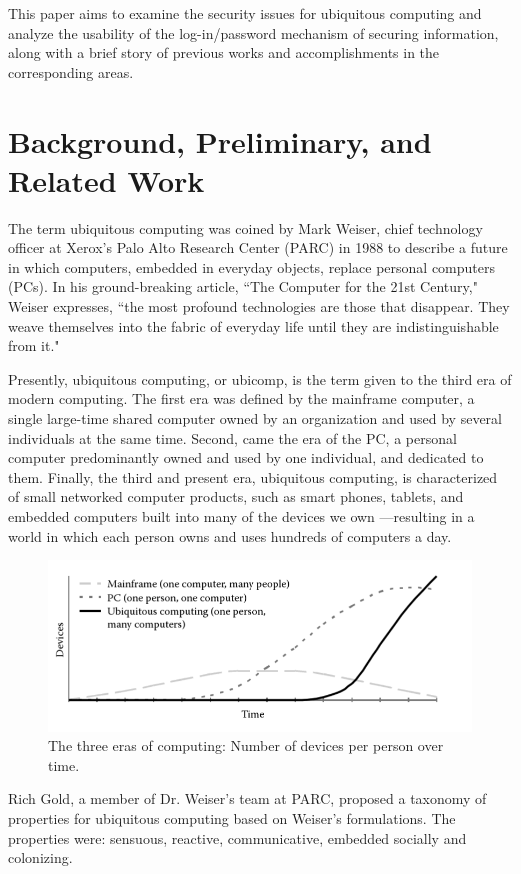 \documentclass{article}
\begin{document}
This paper aims to examine the security issues for ubiquitous computing and analyze the usability of the log-in/password mechanism of securing information, along with a brief story of previous works and accomplishments in the corresponding areas. 

\section{Background, Preliminary, and Related Work}
The term ubiquitous computing was coined by Mark Weiser, chief technology officer at Xerox’s Palo Alto Research Center (PARC) in 1988 to describe a future in which computers, embedded in everyday objects, replace personal computers (PCs). In his ground-breaking article, ``The Computer for the 21st Century," Weiser expresses, ``the most profound technologies are those that disappear. They weave themselves into the fabric of everyday life until they are indistinguishable from it."\cite{weiser1991computer}

Presently, ubiquitous computing, or ubicomp, is the term given to the third era of modern computing. The first era was defined by the mainframe computer, a single large-time shared computer owned by an organization and used by several individuals at the same time. Second, came the era of the PC, a personal computer predominantly owned and used by one individual, and dedicated to them. Finally, the third and present era, ubiquitous computing, is characterized of small networked computer products, such as smart phones, tablets, and embedded computers built into many of the devices we own ---resulting in a world in which each person owns and uses hundreds of computers a day.

\begin{figure}
\includegraphics[scale=.6] {eras_modern_computing.png}
\caption{The three eras of computing: Number of devices per person over time.}
\end{figure}


Rich Gold, a member of Dr. Weiser’s team at PARC, proposed a taxonomy of properties for ubiquitous computing based on Weiser’s formulations. The properties were: sensuous, reactive, communicative, embedded socially and colonizing.\cite{gold2007plenitude} 
\end{document}
